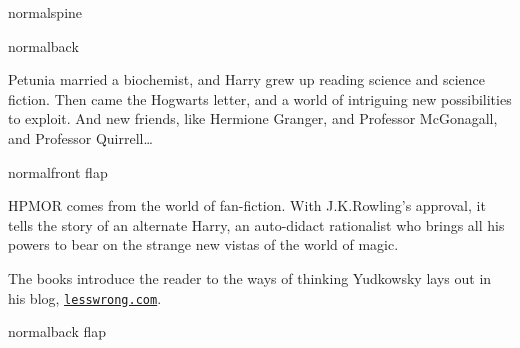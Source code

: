 \documentclass[12pt,coverwidth=\the\hpcoverwidth,coverheight=\the\hpcoverheight,spinewidth=\the\hpspinewidth,marklength=0mm,bleedwidth=5mm,flapwidth=63mm]{bookcover}
\begin{document}
\begin{bookcover}

\begin{bookcoverelement}{normal}{spine}
\centering
\color{white}\scshape
\vspace{0.5cm}\huge \volumenumber\\[2ex]\Large
\vfill
{}
\vfill
\end{bookcoverelement}

\begin{bookcoverelement}{normal}{back}
  \centering
  \vspace{20mm}
  \parbox{110mm}{\color{white}\Large\raggedright
Petunia married a biochemist, and Harry grew up reading science and science fiction. Then came the Hogwarts letter, and a world of intriguing new possibilities to exploit. And new friends, like Hermione Granger, and Professor McGonagall, and Professor Quirrell{\ldots}
}
\end{bookcoverelement}

\begin{bookcoverelement}{normal}{front flap}
\centering
\vspace{20mm}
\parbox{40mm}{\color{white}\raggedright\small
  HPMOR comes from the world of fan-fiction. With J.\?K.\?Rowling's approval, it tells the story of an alternate Harry, an auto-didact rationalist who brings all his powers to bear on the strange new vistas of the world of magic.

  \bigskip The books introduce the reader to the ways of thinking Yudkowsky lays out in his blog, \href{https://www.lesswrong.com/}{\nolinkurl{lesswrong.com}}.}
\end{bookcoverelement}

\begin{bookcoverelement}{normal}{back flap}
\centering
\vspace{20mm}
\parbox{40mm}{\color{white}\small\raggedright
}
\end{bookcoverelement}

\end{bookcover}
\end{document}
